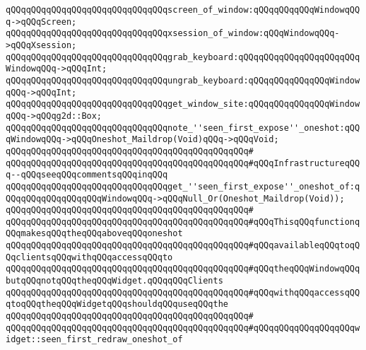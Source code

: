 \verb|qQQqqQQqqQQqqQQqqQQqqQQqqQQqqQQqscreen_of_window:qQQqqQQqqQQqWindowqQQq->qQQqScreen;|\newline
\verb|qQQqqQQqqQQqqQQqqQQqqQQqqQQqqQQqxsession_of_window:qQQqWindowqQQq->qQQqXsession;|\newline
\newline
\verb|qQQqqQQqqQQqqQQqqQQqqQQqqQQqqQQqgrab_keyboard:qQQqqQQqqQQqqQQqqQQqqQQqWindowqQQq->qQQqInt;|\newline
\verb|qQQqqQQqqQQqqQQqqQQqqQQqqQQqqQQqungrab_keyboard:qQQqqQQqqQQqqQQqWindowqQQq->qQQqInt;|\newline
\newline
\verb|qQQqqQQqqQQqqQQqqQQqqQQqqQQqqQQqget_window_site:qQQqqQQqqQQqqQQqWindowqQQq->qQQqg2d::Box;|\newline
\newline
\verb|qQQqqQQqqQQqqQQqqQQqqQQqqQQqqQQqnote_''seen_first_expose''_oneshot:qQQqWindowqQQq->qQQqOneshot_Maildrop(Void)qQQq->qQQqVoid;|\newline
\verb|qQQqqQQqqQQqqQQqqQQqqQQqqQQqqQQqqQQqqQQqqQQqqQQq#|\newline
\verb|qQQqqQQqqQQqqQQqqQQqqQQqqQQqqQQqqQQqqQQqqQQqqQQq#qQQqInfrastructureqQQq--qQQqseeqQQqcommentsqQQqinqQQq|\newline
\newline
\verb|qQQqqQQqqQQqqQQqqQQqqQQqqQQqqQQqget_''seen_first_expose''_oneshot_of:qQQqqQQqqQQqqQQqqQQqWindowqQQq->qQQqNull_Or(Oneshot_Maildrop(Void));|\newline
\verb|qQQqqQQqqQQqqQQqqQQqqQQqqQQqqQQqqQQqqQQqqQQqqQQq#|\newline
\verb|qQQqqQQqqQQqqQQqqQQqqQQqqQQqqQQqqQQqqQQqqQQqqQQq#qQQqThisqQQqfunctionqQQqmakesqQQqtheqQQqaboveqQQqoneshot|\newline
\verb|qQQqqQQqqQQqqQQqqQQqqQQqqQQqqQQqqQQqqQQqqQQqqQQq#qQQqavailableqQQqtoqQQqclientsqQQqwithqQQqaccessqQQqto|\newline
\verb|qQQqqQQqqQQqqQQqqQQqqQQqqQQqqQQqqQQqqQQqqQQqqQQq#qQQqtheqQQqWindowqQQqbutqQQqnotqQQqtheqQQqWidget.qQQqqQQqClients|\newline
\verb|qQQqqQQqqQQqqQQqqQQqqQQqqQQqqQQqqQQqqQQqqQQqqQQq#qQQqwithqQQqaccessqQQqtoqQQqtheqQQqWidgetqQQqshouldqQQquseqQQqthe|\newline
\verb|qQQqqQQqqQQqqQQqqQQqqQQqqQQqqQQqqQQqqQQqqQQqqQQq#|\newline
\verb|qQQqqQQqqQQqqQQqqQQqqQQqqQQqqQQqqQQqqQQqqQQqqQQq#qQQqqQQqqQQqqQQqqQQqwidget::seen_first_redraw_oneshot_of|\newline
